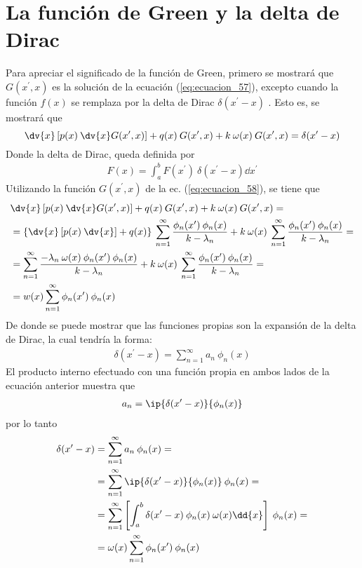 \section{La función de Green y la delta de Dirac}
Para apreciar el significado de la función de Green, primero se mostrará que $G(x^{\prime}, x)$ es la solución de la ecuación (\ref{eq:ecuacion_57}), excepto cuando la función $f(x)$ se remplaza por la delta de Dirac $\delta (x^{\prime} - x)$ . Esto es, se mostrará que
\begin{equation}
\dv{x} \left[ p(x) \: \dv{x} G(x^{\prime}, x) \right] + q(x) \: G(x^{\prime}, x) + k \: \omega (x) \: G(x^{\prime}, x) = \delta (x^{\prime} - x)
\label{eq:ecuacion_59}
\end{equation}
Donde la delta de Dirac, queda definida por
\begin{align*}
F(x) = \int_{a}^{b} F(x^{\prime}) \: \delta (x^{\prime} - x) \dd{x^{\prime}}
\end{align*}
Utilizando la función $G(x^{\prime}, x)$ de la ec. (\ref{eq:ecuacion_58}), se tiene que
\begin{align*}
&\dv{x} \left[ p(x) \: \dv{x} G(x^{\prime}, x) \right] + q(x) \: G(x^{\prime}, x) + k \: \omega (x) \: G(x^{\prime}, x) = \\
&=  \left\{  \dv{x} \left[ p(x) \: \dv{x} \right] + q(x)   \right\} \: \sum_{n=1}^{\infty} \dfrac{\phi_{n}(x^{\prime}) \: \phi_{n}(x)}{k - \lambda_{n}} +  k \: \omega (x) \: \sum_{n=1}^{\infty} \dfrac{\phi_{n}(x^{\prime}) \: \phi_{n}(x)}{k - \lambda_{n}} = \\
&= \sum_{n=1}^{\infty} \dfrac{- \lambda_{n} \: \omega (x) \: \phi_{n}(x^{\prime}) \: \phi_{n}(x)}{k - \lambda_{n}} +  k \: \omega (x) \: \sum_{n=1}^{\infty} \dfrac{\phi_{n}(x^{\prime}) \: \phi_{n}(x)}{k - \lambda_{n}} = \\
&= w(x) \sum_{n=1}^{\infty} \phi_{n}(x^{\prime}) \: \phi_{n}(x)
\end{align*}
De donde se puede mostrar que las funciones propias son la expansión de la delta de Dirac, la cual tendría la forma:
\begin{align*}
\delta (x^{\prime} - x) = \sum_{n=1}^{\infty} a_{n} \: \phi_{n}(x)
\end{align*}
El producto interno efectuado con una función propia en ambos lados de la ecuación anterior muestra que
\begin{align*}
a_{n} = \ip{\delta (x^{\prime} - x)}{\phi_{n}(x)}
\end{align*}
por lo tanto
\begin{align*}
\delta (x^{\prime} - x) &= \sum_{n=1}^{\infty} a_{n} \: \phi_{n}(x) = \\
&= \sum_{n=1}^{\infty} \ip{\delta (x^{\prime} - x)}{\phi_{n}(x)} \: \phi_{n} (x) = \\
&= \sum_{n=1}^{\infty} \left[ \int_{a}^{b} \delta (x^{\prime} - x) \: \phi_{n} (x) \: \omega (x) \dd{x} \right] \: \phi_{n} (x) = \\
&= \omega (x) \sum_{n=1}^{\infty} \phi_{n}(x^{\prime}) \: \phi_{n}(x)
\end{align*}
